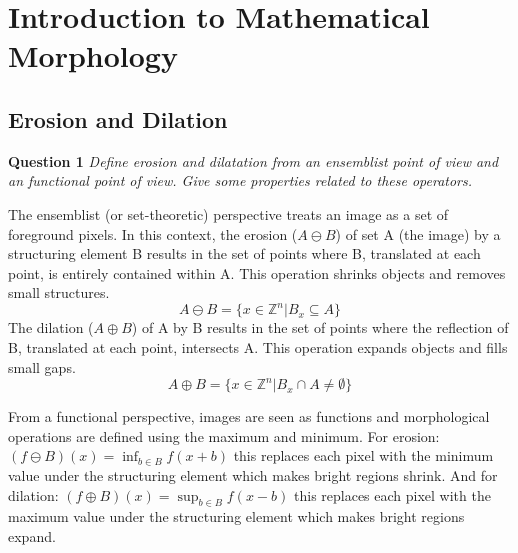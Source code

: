 \section{Introduction to Mathematical Morphology}
\label{sec:introduction_to_mathematical_morphology}



\setcounter{subsection}{1}
\subsection{Erosion and Dilation}
\textbf{Question 1} \textit{Deﬁne erosion and dilatation from an ensemblist point of view and an functional point of view. Give some properties related to these operators.}

The ensemblist (or set-theoretic) perspective treats an image as a set of foreground pixels. In this context, the erosion ($A \ominus B$) of set A (the image) by a structuring element B results in the set of points where B, translated at each point, is entirely contained within A. This operation shrinks objects and removes small structures.
\[
A \ominus B = \{x \in \mathbb{Z}^n
|
B_x \subseteq A \}
\]
The dilation ($A \oplus B$) of A by B results in the set of points where the reflection of B, translated at each point, intersects A. This operation expands objects and fills small gaps.
\[
A \oplus B = \{x \in \mathbb{Z}^n
|B_x \cap A \neq \emptyset\}
\]

From a functional perspective, images are seen as functions and morphological operations are defined using the maximum and minimum. For erosion:
$(f \ominus B)(x) = \inf_{b \in B} f(x + b)$ this replaces each pixel with the minimum value under the structuring element which makes bright regions shrink. And for dilation: $(f \oplus B)(x) = \sup_{b \in B} f(x - b)$ this replaces each pixel with the maximum value under the structuring element which makes bright regions expand.


